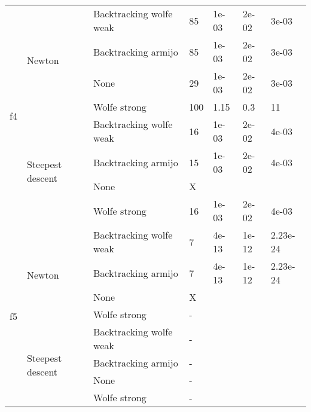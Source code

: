 \documentclass[a4paper,11pt]{article}
\numberwithin{equation}{section} %
\begin{document}
\begin{table}[h!]
\begin{tabular}{|c|l|l|l|l|l|l|}
\multirow{8}{*}{f4}             & \multirow{4}{*}{Newton}           & Backtracking wolfe weak & 85         & 1e-03    & 2e-02     & 3e-03        \\ \cline{3-7}
                                &                                   & Backtracking armijo     & 85         & 1e-03    & 2e-02     & 3e-03        \\ \cline{3-7}
                                &                                   & None                    & 29         & 1e-03    & 2e-02     & 3e-03        \\ \cline{3-7}
                                &                                   & Wolfe strong            & 100        & 1.15     & 0.3       & 11           \\ \cline{2-7}
                                & \multirow{4}{*}{Steepest descent} & Backtracking wolfe weak & 16         & 1e-03    & 2e-02     & 4e-03        \\ \cline{3-7}
                                &                                   & Backtracking armijo     & 15         & 1e-03    & 2e-02     & 4e-03        \\ \cline{3-7}
                                &                                   & None                    & X          &          &           &              \\ \cline{3-7}
                                &                                   & Wolfe strong            & 16         & 1e-03    & 2e-02     & 4e-03        \\ \hline
\multirow{8}{*}{f5}             & \multirow{4}{*}{Newton}           & Backtracking wolfe weak & 7          & 4e-13    & 1e-12     & 2.23e-24     \\ \cline{3-7}
                                &                                   & Backtracking armijo     & 7          & 4e-13    & 1e-12     & 2.23e-24     \\ \cline{3-7}
                                &                                   & None                    & X          &          &           &              \\ \cline{3-7}
                                &                                   & Wolfe strong            & -          &          &           &              \\ \cline{2-7}
                                & \multirow{4}{*}{Steepest descent} & Backtracking wolfe weak & -          &          &           &              \\ \cline{3-7}
                                &                                   & Backtracking armijo     & -          &          &           &              \\ \cline{3-7}
                                &                                   & None                    & -          &          &           &              \\ \cline{3-7}
                                &                                   & Wolfe strong            & -          &          &           &              \\ \hline
\end{tabular}
\end{table}
\end{document}
